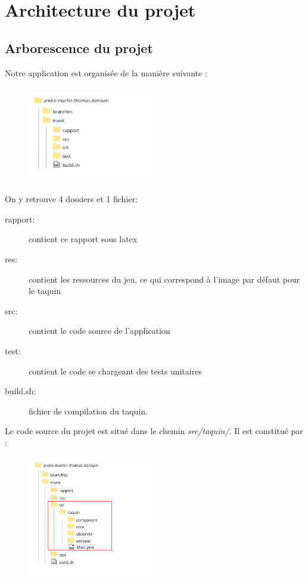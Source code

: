 \chapter{Architecture du projet}

	\section{Arborescence du projet}

		Notre application est organisée de la manière suivante :


		\begin{figure}[H]
			\centering
			\includegraphics[width=0.5\textwidth, keepaspectratio]{img/racine.png}
		\end{figure}

		On y retrouve 4 dossiers et 1 fichier:

		\begin{description}
			\item [rapport:] contient ce rapport sous latex
			\item [res:] contient les ressources du jeu, ce qui correspond à l’image par défaut pour le taquin
			\item [src:] contient le code source de l’application
			\item [test:] contient le code se chargeant des tests unitaires
			\item [build.sh:] fichier de compilation du taquin.
		\end{description}

		Le code source du projet est situé dans le chemin \textit{src/taquin/}. Il est constitué par :

		\begin{figure}[H]
			\centering
			\includegraphics[width=0.5\textwidth, keepaspectratio]{img/detail.png}
		\end{figure}


